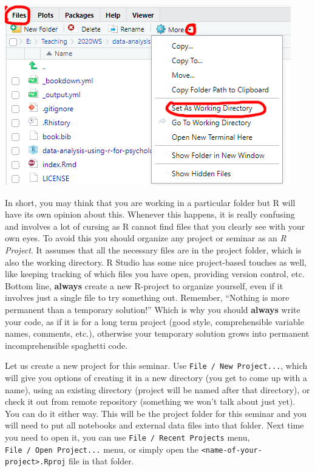 \documentclass[
]{book}
\begin{document}
\begin{center}\includegraphics[width=1\linewidth]{images/setwd-gui} \end{center}

In short, you may think that you are working in a particular folder but R will have its own opinion about this. Whenever this happens, it is really confusing and involves a lot of cursing as R cannot find files that you clearly see with your own eyes. To avoid this you should organize any project or seminar as an \emph{R Project}. It assumes that all the necessary files are in the project folder, which is also the working directory. R Studio has some nice project-based touches as well, like keeping tracking of which files you have open, providing version control, etc. Bottom line, \textbf{always} create a new R-project to organize yourself, even if it involves just a single file to try something out. Remember, ``Nothing is more permanent than a temporary solution!'' Which is why you should \textbf{always} write your code, as if it is for a long term project (good style, comprehensible variable names, comments, etc.), otherwise your temporary solution grows into permanent incomprehensible spaghetti code.

Let us create a new project for this seminar. Use \texttt{File\ /\ New\ Project...}, which will give you options of creating it in a new directory (you get to come up with a name), using an existing directory (project will be named after that directory), or check it out from remote repository (something we won't talk about just yet). You can do it either way. This will be the project folder for this seminar and you will need to put all notebooks and external data files into that folder. Next time you need to open it, you can use \texttt{File\ /\ Recent\ Projects} menu, \texttt{File\ /\ Open\ Project...} menu, or simply open the \texttt{\textless{}name-of-your-project\textgreater{}.Rproj} file in that folder.
\end{document}
